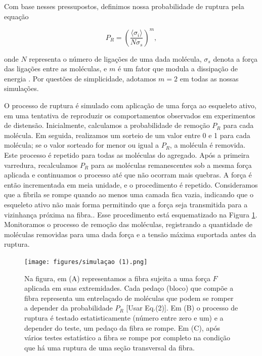 \documentclass{article}
\begin{document}
        Com base nesses pressupostos, definimos nossa probabilidade de ruptura pela equação 

        \begin{equation}
            P_{R} = \left(\frac{\langle \sigma_{i} \rangle}{N \sigma_{s}}\right)^{m},
        \end{equation}

        \noindent onde \(N\) representa o número de ligações de uma dada molécula, \(\sigma_{s}\) denota a força das ligações entre as moléculas, e 
        \(m\) é um fator que modula a dissipação de energia \cite{Parkinson1997,2013}. Por questões de simplicidade, adotamos \(m = 2\)  em todas as 
        nossas simulações.

        O processo de ruptura é simulado com aplicação de uma força ao esqueleto ativo, em uma tentativa de reproduzir os comportamentos observados 
        em experimentos de distensão. Inicialmente, calculamos a probabilidade de remoção \(P_{R}\) para cada molécula. Em seguida, realizamos um 
        sorteio de um valor entre 0 e 1 para cada molécula; se o valor sorteado for menor ou igual a \(P_{R}\), a molécula é removida. Este processo 
        é repetido para todas as moléculas do agregado. Após a primeira varredura, recalculamos \(P_{R}\) para as moléculas remanescentes sob a mesma 
        força aplicada e continuamos o processo até que não ocorram mais quebras. A força é então incrementada em meia unidade, e o procedimento é 
        repetido. Consideramos que a fibrila se rompe quando ao menos uma camada fica vazia, indicando que o esqueleto ativo não mais forma permitindo 
        que a força seja transmitida para a vizinhança próxima na fibra.. Esse procedimento está esquematizado na Figura \ref{M4}. Monitoramos o 
        processo de remoção das moléculas, registrando a quantidade de moléculas removidas para uma dada força e a tensão máxima suportada antes da 
        ruptura. 


        \begin{figure}[H]
            \centering
            \texttt{[image: figures/simulaçao (1).png]}
    
            \caption{Na figura, em (A) representamos a fibra sujeita a uma força $F$ aplicada em suas extremidades. Cada pedaço (bloco) que compõe 
            a fibra representa um entrelaçado de moléculas que podem se romper a depender da probabilidade $P_{R}$ [Usar Eq.(2)]. Em (B) o processo 
            de ruptura é testado estatisticamente (número entre zero e um) e a depender do teste, um pedaço da fibra se rompe. Em (C), após vários 
            testes estatístico a fibra se rompe por completo na condição que há uma ruptura de uma seção transversal da fibra.} 
    
            \label{M4}
        \end{figure}
\end{document}
